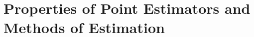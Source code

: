 \chapter{Properties of Point Estimators and Methods of Estimation}
\newpage 
\newpage 
\newpage 
\newpage 
\newpage 